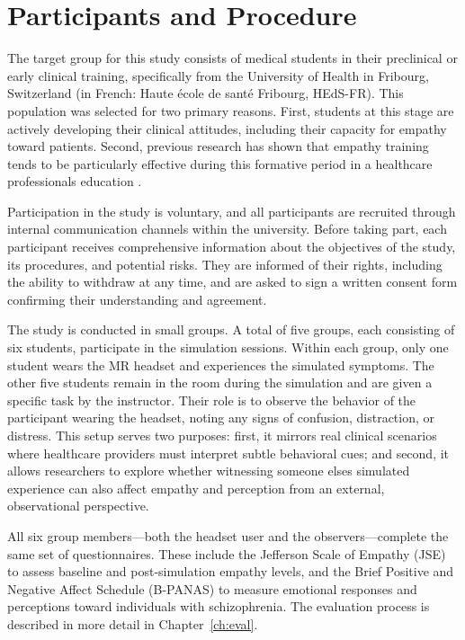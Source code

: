 \section{Participants and Procedure}

The target group for this study consists of medical students in their preclinical or early clinical training, specifically from the University of Health in Fribourg, Switzerland (in French: Haute école de santé Fribourg, HEdS-FR). This population was selected for two primary reasons. First, students at this stage are actively developing their clinical attitudes, including their capacity for empathy toward patients. Second, previous research has shown that empathy training tends to be particularly effective during this formative period in a healthcare professionals education \cite{Hsia2022, Kuhail2022}.

Participation in the study is voluntary, and all participants are recruited through internal communication channels within the university. Before taking part, each participant receives comprehensive information about the objectives of the study, its procedures, and potential risks. They are informed of their rights, including the ability to withdraw at any time, and are asked to sign a written consent form confirming their understanding and agreement.

The study is conducted in small groups. A total of five groups, each consisting of six students, participate in the simulation sessions. Within each group, only one student wears the MR headset and experiences the simulated symptoms. The other five students remain in the room during the simulation and are given a specific task by the instructor. Their role is to observe the behavior of the participant wearing the headset, noting any signs of confusion, distraction, or distress. This setup serves two purposes: first, it mirrors real clinical scenarios where healthcare providers must interpret subtle behavioral cues; and second, it allows researchers to explore whether witnessing someone elses simulated experience can also affect empathy and perception from an external, observational perspective.

All six group members—both the headset user and the observers—complete the same set of questionnaires. These include the Jefferson Scale of Empathy (JSE) \cite{Hojat2002} to assess baseline and post-simulation empathy levels, and the Brief Positive and Negative Affect Schedule (B-PANAS) \cite{Boiroux2024} to measure emotional responses and perceptions toward individuals with schizophrenia. The evaluation process is described in more detail in Chapter~\ref{ch:eval}.

